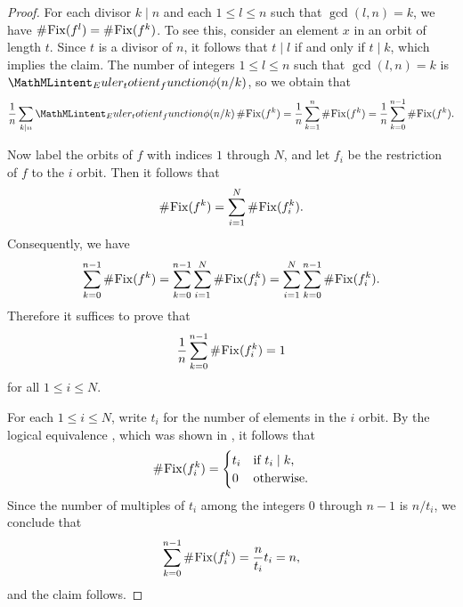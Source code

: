 \begin{proof}
  For each divisor $k\mid n$ and each $1\leq l\leq n$ such that $\gcd(l,n)=k$, we have $\mathord{\#}\mkern1mu \mathrm{Fix}(f^l)=\mathord{\#}\mkern1mu \mathrm{Fix}(f^k)$. To see this, consider an element $x$ in an orbit of length $t$. Since $t$ is a divisor of $n$, it follows that $t\mid l$ if and only if $t\mid k$, which implies the claim. The number of integers $1\leq l\leq n$ such that $\gcd(l,n)=k$ is $\totient(n/k)$, so we obtain that
  \begin{equation*}
    \frac{1}{n}\sum_{k\mid n}\totient(n/k)\,\cardinality{\mathrm{Fix}(f^k)}=
    \frac{1}{n}\sum_{k=1}^{n}\cardinality{\mathrm{Fix}(f^k)}=
    \frac{1}{n}\sum_{k=0}^{n-1}\cardinality{\mathrm{Fix}(f^k)}.
  \end{equation*}

  Now label the orbits of $f$ with indices $1$ through $N$, and let $f_i$ be the restriction of $f$ to the $i$\supth{} orbit. Then it follows that
  \begin{equation*}
    \mathord{\#}\mkern1mu \mathrm{Fix}(f^k)=\sum_{i=1}^N\mathord{\#}\mkern1mu \mathrm{Fix}(f_i^k).
  \end{equation*}
  Consequently, we have
  \begin{equation*}
    \sum_{k=0}^{n-1}\mathord{\#}\mkern1mu \mathrm{Fix}(f^k)=\sum_{k=0}^{n-1}\sum_{\vphantom{k}i=1}^N\mathord{\#}\mkern1mu \mathrm{Fix}(f_i^k)=\sum_{\vphantom{k}i=1}^N\sum_{k=0}^{n-1}\mathord{\#}\mkern1mu \mathrm{Fix}(f_i^k).
  \end{equation*}
  Therefore it suffices to prove that
  \begin{equation*}
    \frac{1}{n}\sum_{k=0}^{n-1}\mathord{\#}\mkern1mu \mathrm{Fix}(f_i^k)=1
  \end{equation*}
  for all $1\leq i\leq N$.

  For each $1\leq i\leq N$, write $t_i$ for the number of elements in the $i$\supth{} orbit. By the logical equivalence , which was shown in , it follows that
  \begin{equation*}
    \mathord{\#}\mkern1mu \mathrm{Fix}(f_i^k)=
    \begin{cases}
      t_i & \text{if $t_i\mid k$,}\\
      0 & \text{otherwise.}
    \end{cases}
  \end{equation*}
  Since the number of multiples of $t_i$ among the integers $0$ through $n-1$ is $n/t_i$, we conclude that
  \begin{equation*}
    \sum_{k=0}^{n-1}\mathord{\#}\mkern1mu \mathrm{Fix}(f_i^k)=\frac{n}{t_i}t_i=n,
  \end{equation*}
  and the claim follows.
\end{proof}

